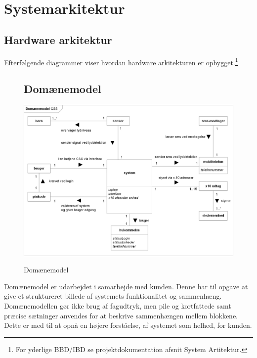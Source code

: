 \chapter{Systemarkitektur}

\section{Hardware arkitektur}

Efterfølgende diagrammer viser hvordan hardware arkitekturen er opbygget.\footnote{For yderlige BBD/IBD se projektdokumentation afsnit System Artitektur.}

\begin{figure}[htbp] \centering
\section{Domænemodel}
{\includegraphics[width=\textwidth]{billeder/diagrammer/Domain_Model}}
\caption{Domænemodel}
\label{lab:domainmodel}
\end{figure}
Domænemodel er udarbejdet i samarbejde med kunden. Denne har til opgave at give et struktureret billede af systemets funktionalitet og sammenhæng. Domænemodellen gør ikke brug af fagudtryk, men pile og kortfattede samt præcise sætninger anvendes for at beskrive sammenhængen mellem blokkene. Dette er med til at opnå en højere forståelse, af systemet som helhed, for kunden.

\newpage

